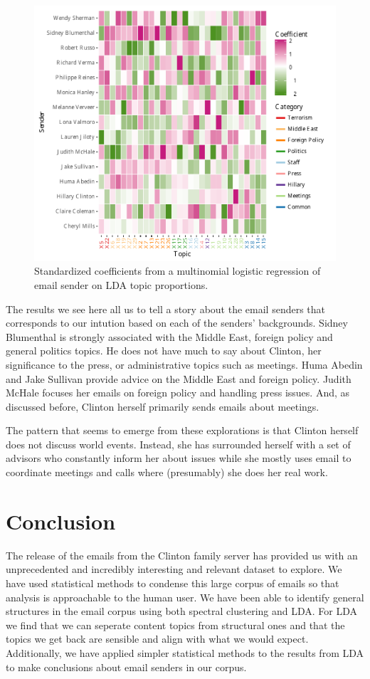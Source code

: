 \documentclass[12pt]{article}
\theoremstyle{definition}
\theoremstyle{algodesc}
\begin{document}
\begin{figure}[htb] \centering
  \includegraphics[width=0.95\linewidth]{../images/coefficients.pdf}
  \caption{Standardized coefficients from a multinomial logistic regression of email sender on LDA topic proportions.}
  \label{fig:coefficients}
\end{figure}

The results we see here all us to tell a story about the email senders that corresponds to our intution based on each of the senders' backgrounds. Sidney Blumenthal is strongly associated with the Middle East, foreign policy and general politics topics. He does not have much to say about Clinton, her significance to the press, or administrative topics such as meetings. Huma Abedin and Jake Sullivan provide advice on the Middle East and foreign policy. Judith McHale focuses her emails on foreign policy and handling press issues. And, as discussed before, Clinton herself primarily sends emails about meetings.

The pattern that seems to emerge from these explorations is that Clinton herself does not discuss world events. Instead, she has surrounded herself with a set of advisors who constantly inform her about issues while she mostly uses email to coordinate meetings and calls where (presumably) she does her real work.


\section{Conclusion}
The release of the emails from the Clinton family server has provided us with an unprecedented and incredibly interesting and relevant dataset to explore. We have used statistical methods to condense this large corpus of emails so that analysis is approachable to the human user. We have been able to identify general structures in the email corpus using both spectral clustering and LDA. For LDA we find that we can seperate content topics from structural ones and that the topics we get back are sensible and align with what we would expect. Additionally, we have applied simpler statistical methods to the results from LDA to make conclusions about email senders in our corpus.
\end{document}
